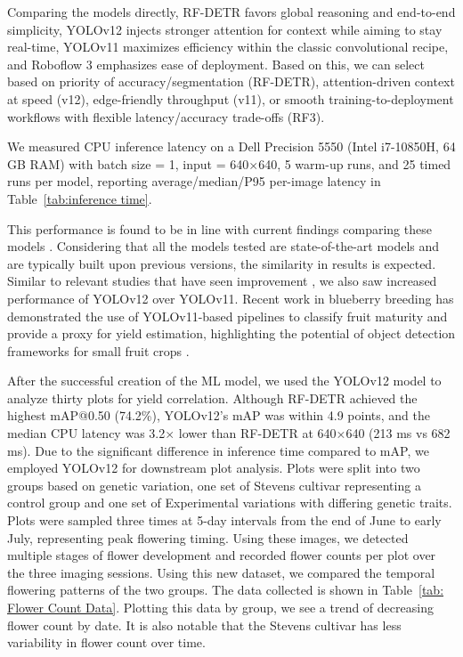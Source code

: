 

Comparing the models directly, RF-DETR favors global reasoning and end-to-end simplicity, YOLOv12 injects stronger attention for context while aiming to stay real-time, YOLOv11 maximizes efficiency within the classic convolutional recipe, and Roboflow 3 emphasizes ease of deployment. Based on this, we can select based on priority of accuracy/segmentation (RF-DETR), attention-driven context at speed (v12), edge-friendly throughput (v11), or smooth training-to-deployment workflows with flexible latency/accuracy trade-offs (RF3).


 We measured CPU inference latency on a Dell Precision 5550 (Intel i7-10850H, 64 GB RAM) with batch size = 1, input = 640$\times$640, 5 warm-up runs, and 25 timed runs per model, reporting average/median/P95 per-image latency in Table~\ref{tab:inference time}.




This performance is found to be in line with current findings comparing these models \cite{kumar_container_2025}. Considering that all the models tested are state-of-the-art models and are typically built upon previous versions, the similarity in results is expected. Similar to relevant studies that have seen improvement \cite{yang_gtdr-yolov12_2025}, we also saw increased performance of YOLOv12 over YOLOv11. Recent work in blueberry breeding has demonstrated the use of YOLOv11-based pipelines to classify fruit maturity and provide a proxy for yield estimation, highlighting the potential of object detection frameworks for small fruit crops \cite{zhang_open-source_2024,li_high-throughput_2025}.

After the successful creation of the ML model, we used the YOLOv12 model to analyze thirty plots for yield correlation. Although RF-DETR achieved the highest mAP@0.50 (74.2\%), YOLOv12’s mAP was within 4.9 points, and the median CPU latency was 3.2$\times$ lower than RF-DETR at 640×640 (213 ms vs 682 ms). Due to the significant difference in inference time compared to mAP, we employed YOLOv12 for downstream plot analysis.  Plots were split into two groups based on genetic variation, one set of Stevens cultivar representing a control group and one set of Experimental variations with differing genetic traits. Plots were sampled three times at 5-day intervals from the end of June to early July, representing peak flowering timing. Using these images, we detected multiple stages of flower development and recorded flower counts per plot over the three imaging sessions. Using this new dataset, we compared the temporal flowering patterns of the two groups. The data collected is shown in Table~\ref{tab: Flower Count Data}. Plotting this data by group, we see a trend of decreasing flower count by date. It is also notable that the Stevens cultivar has less variability in flower count over time. 

